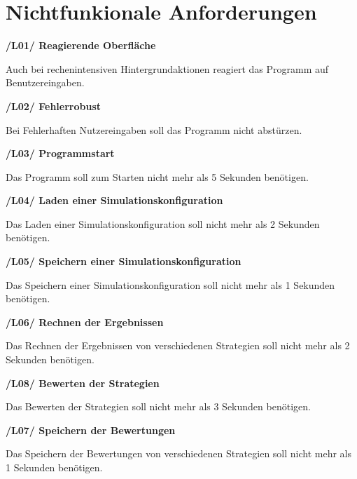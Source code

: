 \section{Nichtfunkionale Anforderungen}
\textbf{/L01/ Reagierende Oberfläche}

Auch bei rechenintensiven Hintergrundaktionen reagiert das Programm auf Benutzereingaben.

\textbf{/L02/ Fehlerrobust}

Bei Fehlerhaften Nutzereingaben soll das Programm nicht abstürzen.

\textbf{/L03/ Programmstart}

Das Programm soll zum Starten nicht mehr als 5 Sekunden benötigen.

\textbf{/L04/ Laden einer Simulationskonfiguration}

Das Laden einer Simulationskonfiguration soll nicht mehr als 2 Sekunden benötigen.

\textbf{/L05/ Speichern einer Simulationskonfiguration}

Das Speichern einer Simulationskonfiguration soll nicht mehr als 1 Sekunden benötigen.

\textbf{/L06/ Rechnen der Ergebnissen}

Das Rechnen der Ergebnissen von verschiedenen Strategien soll nicht mehr als 2 Sekunden benötigen.

\textbf{/L08/ Bewerten der Strategien}

Das Bewerten der Strategien soll nicht mehr als 3 Sekunden benötigen.

\textbf{/L07/ Speichern der Bewertungen}

Das Speichern der Bewertungen von verschiedenen Strategien soll nicht mehr als 1 Sekunden benötigen.